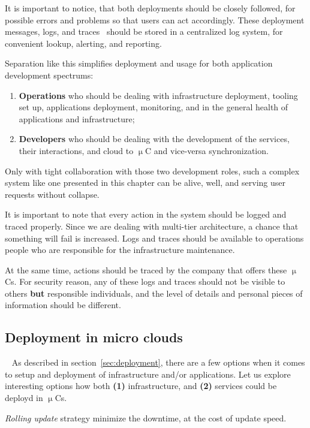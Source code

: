 \noindent
It is important to notice, that both deployments should be closely followed, for possible errors and problems so that users can act accordingly. These deployment messages, logs, and traces~\cite{36356} should be stored in a centralized log system, for convenient lookup, alerting, and reporting.

Separation like this simplifies deployment and usage for both application development spectrums: 

\begin{enumerate}[start=1,label={(\bfseries \roman*)}]
	\item \textbf{Operations} who should be dealing with infrastructure deployment, tooling set up, applications deployment, monitoring, and in the general health of applications and infrastructure;
	\item \textbf{Developers} who should be dealing with the development of the services, their interactions, and cloud to $\upmu$C and vice-versa synchronization.
\end{enumerate}

\noindent
Only with tight collaboration with those two development roles, such a complex system like one presented in this chapter can be alive, well, and serving user requests without collapse.

It is important to note that every action in the system should be logged and traced properly. Since we are dealing with multi-tier architecture, a chance that something will fail is increased. Logs and traces should be available to operations people who are responsible for the infrastructure maintenance. 

At the same time, actions should be traced by the company that offers these $\upmu$Cs. For security reason, any of these logs and traces should not be visible to others \textbf{but} responsible individuals, and the level of details and personal pieces of information should be different.
%
%
\subsection{Deployment in micro clouds}~\label{sec:dep_mc}
%
As described in section~\ref{sec:deployment}, there are a few options when it comes to setup and deployment of infrastructure and/or applications. Let us explore interesting options how both \textbf{(1)} infrastructure, and \textbf{(2)} services could be deployd in $\upmu$Cs.

\emph{Rolling update} strategy minimize the downtime, at the cost of update speed. 


